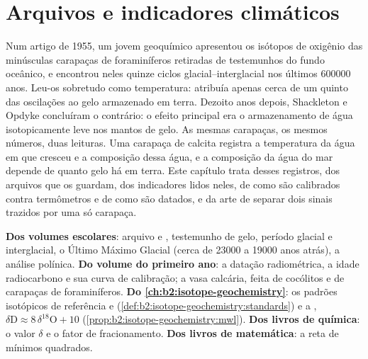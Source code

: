 \chapter{Arquivos e indicadores climáticos}\label{ch:b2:climate-proxies}

Num artigo de 1955, um jovem geoquímico apresentou os isótopos de oxigênio das minúsculas carapaças de
foraminíferos retiradas de testemunhos do fundo oceânico, e encontrou neles quinze ciclos glacial--interglacial nos
últimos \num{600000} anos. Leu-os sobretudo como temperatura: atribuía apenas cerca de um quinto das
oscilações ao gelo armazenado em terra. Dezoito anos depois, Shackleton e Opdyke concluíram o
contrário: o efeito principal era o armazenamento de água isotopicamente leve nos mantos de
gelo. As mesmas carapaças, os mesmos números, duas leituras. Uma carapaça de calcita registra a
temperatura da água em que cresceu e a composição dessa água, e a composição da
água do mar depende de quanto gelo há em terra. Este capítulo trata desses registros, dos
arquivos que os guardam, dos indicadores lidos neles, de como são calibrados contra termômetros
e de como são datados, e da arte de separar dois sinais trazidos por uma só carapaça.

\begin{recall}
\textbf{Dos volumes escolares}: arquivo e , testemunho de gelo, período glacial e
interglacial, o Último Máximo Glacial (cerca de \num{23000} a \num{19000} anos atrás), a análise
polínica. \textbf{Do volume do primeiro ano}: a datação radiométrica, a idade radiocarbono e sua
curva de calibração; a vasa calcária, feita de cocólitos e de carapaças de foraminíferos.
\textbf{Do \cref{ch:b2:isotope-geochemistry}}: os padrões isotópicos de referência  e 
(\cref{def:b2:isotope-geochemistry:standards}) e a , $\delta\mathrm{D}
\approx 8\,\delta^{18}\mathrm{O} + 10$ (\cref{prop:b2:isotope-geochemistry:mwl}). \textbf{Dos
livros de química}: o valor $\delta$ e o fator de fracionamento. \textbf{Dos livros de
matemática}: a reta de mínimos quadrados.
\end{recall}

